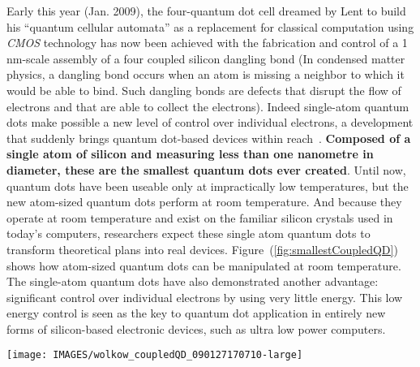 Early this year (Jan. 2009), the four-quantum dot cell dreamed by Lent to build his ``quantum cellular automata'' as a replacement for classical computation using \textit{CMOS} technology has now been achieved with the fabrication and control of a 1 nm-scale assembly of a four coupled silicon dangling bond (In condensed matter physics, a dangling bond occurs when an atom is missing a neighbor to which it would be able to bind. Such dangling bonds are defects that disrupt the flow of electrons and that are able to collect the electrons).
Indeed single-atom quantum dots make possible a new level of control over individual electrons, a development that suddenly brings quantum dot-based devices within reach~\cite{smallestQD}. \textbf{Composed of a single atom of silicon and measuring less than one nanometre in diameter, these are the smallest quantum dots ever created}.
Until now, quantum dots have been useable only at impractically low temperatures, but the new atom-sized quantum dots perform at room temperature. And because they operate at room temperature and exist on the familiar silicon crystals used in today's computers, researchers expect these single atom quantum dots to transform theoretical plans into real devices. 
Figure~(\ref{fig:smallestCoupledQD}) shows how atom-sized quantum dots can be manipulated at room temperature.
The single-atom quantum dots have also demonstrated another advantage: significant control over individual electrons by using very little energy. This low energy control is seen as the key to quantum dot application in entirely new forms of silicon-based electronic devices, such as ultra low power computers.

\begin{SCfigure}
 \caption{Two coupled atomic quantum dots are shown in this room temperature scanning tunneling microscopy image.
In the top frame the dots share one electron. The electron moves freely between the dots just like an electron in a chemical bond within a molecule. The lower frame demonstrates control over that single electron and the potential to do computations in a new way. The electric field from the control charge pushes the electron to prefer staying on only one of the quantum dots.
(Image courtesy of University of Alberta/Prof. Robert A. Wolkow)}
 \label{fig:smallestCoupledQD}

\centering
 \texttt{[image: IMAGES/wolkow\_coupledQD\_090127170710-large]}
\end{SCfigure}




